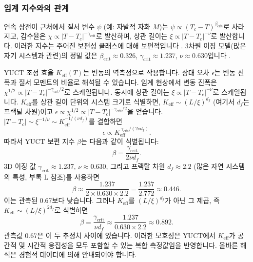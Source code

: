 \documentclass[11pt,a4paper]{article}
\begin{document}
	\subsubsection{임계 지수와의 관계}
	연속 상전이 근처에서 질서 변수 $\psi$ (예: 자발적 자화 $M$)는 $\psi \propto (T_c - T)^{\beta_{\mathrm{crit}}}$로 사라지고, 감수율은 $\chi \propto |T - T_c|^{-\gamma_{\mathrm{crit}}}$로 발산하며, 상관 길이는 $\xi \propto |T - T_c|^{-\nu}$로 발산합니다. 이러한 지수는 주어진 보편성 클래스에 대해 보편적입니다 \cite{Wilson1974, Fisher1974}. 3차원 이징 모델(많은 자기 시스템과 관련)의 정밀 값은 $\beta_{\mathrm{crit}} \approx 0.326$, $\gamma_{\mathrm{crit}} \approx 1.237$, $\nu \approx 0.630$입니다 \cite{El-Showk2014}.
	
	YUCT 조정 효율 $K_{\mathrm{eff}}(T)$는 변동의 역측정으로 작용합니다. 상대 오차 $\epsilon$는 변동 진폭과 질서 모멘트의 비율로 해석될 수 있습니다. 임계 현상에서 변동 진폭은 $\chi^{1/2} \propto |T - T_c|^{-\gamma_{\mathrm{crit}}/2}$로 스케일됩니다. 동시에 상관 길이는 $\xi \propto |T - T_c|^{-\nu}$로 스케일됩니다. $K_{\mathrm{eff}}$를 상관 길이 단위의 시스템 크기로 식별하면, $K_{\mathrm{eff}} \sim (L/\xi)^{d_f}$ (여기서 $d_f$는 프랙탈 차원)이고 $\epsilon \propto \chi^{1/2} \propto |T - T_c|^{-\gamma_{\mathrm{crit}}/2}$을 얻습니다. $|T - T_c| \sim \xi^{-1/\nu} \sim K_{\mathrm{eff}}^{-1/(\nu d_f)}$를 결합하면
	\[
	\epsilon \propto K_{\mathrm{eff}}^{\,\gamma_{\mathrm{crit}}/(2\nu d_f)}.
	\]
	따라서 YUCT 보편 지수 $\beta$는 다음과 같이 식별됩니다:
	\begin{equation}
		\label{eq:beta-from-critical}
		\beta = \frac{\gamma_{\mathrm{crit}}}{2\nu d_f}.
	\end{equation}
	3D 이징 값 $\gamma_{\mathrm{crit}} \approx 1.237$, $\nu \approx 0.630$, 그리고 프랙탈 차원 $d_f \approx 2.2$ (많은 자연 시스템의 특성, 부록 L 참조)를 사용하면
	\[
	\beta \approx \frac{1.237}{2 \times 0.630 \times 2.2} = \frac{1.237}{2.772} \approx 0.446.
	\]
	이는 관측된 0.67보다 낮습니다. 그러나 $K_{\mathrm{eff}}$를 $(L/\xi)^{d_f}$가 아닌 그 제곱, 즉 $K_{\mathrm{eff}} \sim (L/\xi)^{2d_f}$로 식별하면
	\[
	\beta = \frac{\gamma_{\mathrm{crit}}}{\nu d_f} \approx \frac{1.237}{0.630 \times 2.2} \approx 0.892.
	\]
	관측값 0.67은 이 두 추정치 사이에 있습니다. 이러한 모호성은 YUCT에서 $K_{\mathrm{eff}}$가 공간적 및 시간적 응집성을 모두 포함할 수 있는 복합 측정값임을 반영합니다. 올바른 해석은 경험적 데이터에 의해 안내되어야 합니다.
	
\end{document}
